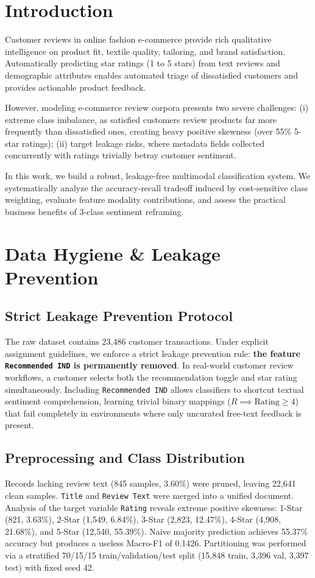\documentclass[conference]{IEEEtran}
\begin{document}
\section{Introduction}
Customer reviews in online fashion e-commerce provide rich qualitative intelligence on product fit, textile quality, tailoring, and brand satisfaction. Automatically predicting star ratings (1 to 5 stars) from text reviews and demographic attributes enables automated triage of dissatisfied customers and provides actionable product feedback.

However, modeling e-commerce review corpora presents two severe challenges: (i) extreme class imbalance, as satisfied customers review products far more frequently than dissatisfied ones, creating heavy positive skewness (over 55\% 5-star ratings); (ii) target leakage risks, where metadata fields collected concurrently with ratings trivially betray customer sentiment.

In this work, we build a robust, leakage-free multimodal classification system. We systematically analyze the accuracy-recall tradeoff induced by cost-sensitive class weighting, evaluate feature modality contributions, and assess the practical business benefits of 3-class sentiment reframing.

\section{Data Hygiene \& Leakage Prevention}
\subsection{Strict Leakage Prevention Protocol}
The raw dataset contains 23,486 customer transactions. Under explicit assignment guidelines, we enforce a strict leakage prevention rule: \textbf{the feature \texttt{Recommended IND} is permanently removed}. In real-world customer review workflows, a customer selects both the recommendation toggle and star rating simultaneously. Including \texttt{Recommended IND} allows classifiers to shortcut textual sentiment comprehension, learning trivial binary mappings ($R \implies \text{Rating} \ge 4$) that fail completely in environments where only uncurated free-text feedback is present.

\subsection{Preprocessing and Class Distribution}
Records lacking review text (845 samples, 3.60\%) were pruned, leaving 22,641 clean samples. \texttt{Title} and \texttt{Review Text} were merged into a unified document. Analysis of the target variable \texttt{Rating} reveals extreme positive skewness: 1-Star (821, 3.63\%), 2-Star (1,549, 6.84\%), 3-Star (2,823, 12.47\%), 4-Star (4,908, 21.68\%), and 5-Star (12,540, 55.39\%). Naive majority prediction achieves 55.37\% accuracy but produces a useless Macro-F1 of 0.1426. Partitioning was performed via a stratified 70/15/15 train/validation/test split (15,848 train, 3,396 val, 3,397 test) with fixed seed 42.
\end{document}
